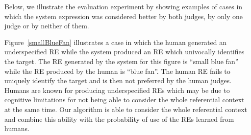 

Below, we illustrate the evaluation experiment by showing examples of cases in which the system expression was considered better by both judges, by only one judge or by neither of them. 

Figure~\ref{smallBlueFan} illustrates a case in which the human generated an underspecified RE while the system produced an RE which univocally identifies the target. The RE generated by the system for this figure is ``small blue fan'' while the RE produced by the human is ``blue fan''. The human RE fails to uniquely identify the target and is then not preferred by the human judges. Humans are known for producing underspecified REs which may be due to cognitive limitations for not being able to consider the whole referential context at the same time. Our algorithm is able to consider the whole referential context and combine this ability with the probability of use of the REs learned from humans. 

